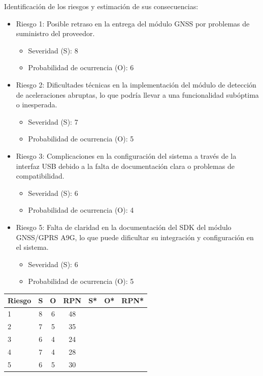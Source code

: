\documentclass[
11pt, %
codirector, %
]{charter}
\begin{document}
 Identificación de los riesgos y estimación de sus consecuencias:

    \begin{itemize}
    
        \item Riesgo 1: Posible retraso en la entrega del módulo GNSS por problemas de suministro del proveedor.
        \begin{itemize}
            \item Severidad (S): 8
            \item Probabilidad de ocurrencia (O): 6
        \end{itemize}  
        
        \item Riesgo 2: Dificultades técnicas en la implementación del módulo de detección de aceleraciones abruptas, lo que podría llevar a una funcionalidad subóptima o inesperada.
        \begin{itemize}
            \item Severidad (S): 7
            \item Probabilidad de ocurrencia (O): 5
        \end{itemize}  
        
        \item Riesgo 3: Complicaciones en la configuración del sistema a través de la interfaz USB debido a la falta de documentación clara o problemas de compatibilidad.
        \begin{itemize}
            \item Severidad (S): 6
            \item Probabilidad de ocurrencia (O): 4
        \end{itemize}  

        \item Riesgo 5: Falta de claridad en la documentación del SDK del módulo GNSS/GPRS A9G, lo que puede dificultar su integración y configuración en el sistema.
        \begin{itemize}
            \item Severidad (S): 6
            \item Probabilidad de ocurrencia (O): 5
        \end{itemize}  
    \end{itemize}  



\begin{table}[htpb]
\centering
\begin{tabularx}{\linewidth}{@{}|X|c|c|c|c|c|c|@{}}
\hline
\rowcolor[HTML]{C0C0C0} 
Riesgo & S & O & RPN & S* & O* & RPN* \\ \hline
    1   & 8  & 6  &  48   &    &    &      \\ \hline
    2   & 7  & 5  &  35   &    &    &      \\ \hline
    3   & 6  &  4 &  24   &    &    &      \\ \hline
    4   & 7  & 4  &  28   &    &    &      \\ \hline
    5   & 6  & 5  &  30   &    &    &      \\ \hline
\end{tabularx}%
\end{table}
\end{document}
